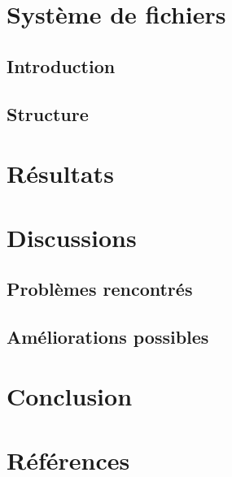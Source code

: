 \documentclass[a4paper]{article}
\begin{document}
\newpage

\section{Système de fichiers}
\subsection{Introduction}


\subsection{Structure}

\newpage

\section{Résultats}

\newpage

\section{Discussions}
\subsection{Problèmes rencontrés}


\subsection{Améliorations possibles}

\newpage

\section{Conclusion}

\newpage

\section{Références}
\nocite{*}


\end{document}
